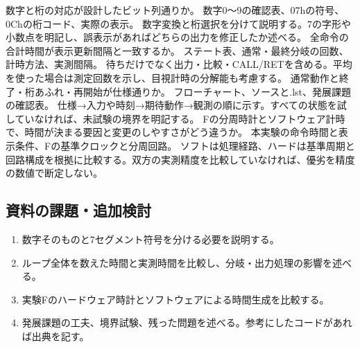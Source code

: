 \documentclass[lualatex,a4paper,10pt]{jlreq}
\begin{document}
{数字と桁の対応が設計したビット列通りか。}
{数字0〜9の確認表、07hの符号、0Chの桁コード、実際の表示。}
{数字変換と桁選択を分けて説明する。7の字形や小数点を明記し、誤表示があればどちらの出力を修正したか述べる。}
{全命令の合計時間が表示更新間隔と一致するか。}
{ステート表、通常・最終分岐の回数、計時方法、実測間隔。}
{待ちだけでなく出力・比較・CALL/RETを含める。平均を使った場合は測定回数を示し、目視計時の分解能も考慮する。}
{通常動作と終了・桁あふれ・再開始が仕様通りか。}
{フローチャート、ソースと.lst、発展課題の確認表。}
{仕様→入力や時刻→期待動作→観測の順に示す。すべての状態を試していなければ、未試験の境界を明記する。}
{Fの分周時計とソフトウェア計時で、時間が決まる要因と変更のしやすさがどう違うか。}
{本実験の命令時間と表示条件、Fの基準クロックと分周回路。}
{ソフトは処理経路、ハードは基準周期と回路構成を根拠に比較する。双方の実測精度を比較していなければ、優劣を精度の数値で断定しない。}
\subsection{資料の課題・追加検討}
\begin{enumerate}
\item 数字そのものと7セグメント符号を分ける必要を説明する。
\item ループ全体を数えた時間と実測時間を比較し、分岐・出力処理の影響を述べる。
\item 実験Fのハードウェア時計とソフトウェアによる時間生成を比較する。
\item 発展課題の工夫、境界試験、残った問題を述べる。参考にしたコードがあれば出典を記す。
\end{enumerate}
\writing{25mm}
\end{document}
